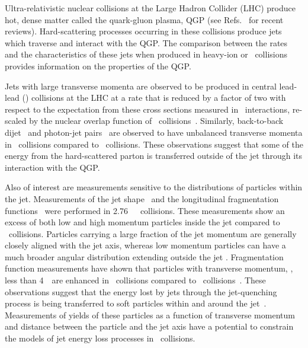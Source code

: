 
Ultra-relativistic nuclear collisions at the Large Hadron Collider (LHC) produce hot, dense matter
called the quark-gluon plasma, QGP (see Refs.~\cite{Roland:2014jsa,Busza:2018rrf} for recent reviews).
Hard-scattering processes occurring in these collisions produce jets which
traverse and interact with the QGP. The comparison between the rates and the characteristics of these jets when produced in heavy-ion or \pp\ collisions provides information on the properties of the QGP.

Jets with large transverse momenta are observed to be produced in central lead-lead (\pbpb) collisions at the LHC at a rate that is reduced by a factor of two with respect to the expectation from these cross sections measured in \pp\ interactions, re-scaled by the nuclear overlap function of \pbpb\ collisions~\cite{Abelev:2013kqa,Aad:2014bxa,Khachatryan:2016jfl}. 
Similarly, back-to-back dijet~\cite{Aad:2010bu,Chatrchyan:2011sx,Aaboud:2017eww} 
and photon-jet pairs~\cite{Chatrchyan:2012gt} are observed to have
unbalanced transverse momenta in \pbpb\ collisions compared to \pp\ collisions.
These observations suggest that some of the energy from the hard-scattered parton is
transferred outside of the jet through its interaction with the QGP.  

Also of interest are measurements sensitive to the distributions of particles
within the jet.  Measurements of the jet shape~\cite{Chatrchyan:2013kwa} and  the longitudinal fragmentation functions~\cite{Aad:2014wha,Chatrchyan:2014ava,Aaboud:2017bzv} were performed in 2.76~\TeV\ \pbpb\
collisions.
These measurements show an excess of both low and high momentum particles inside the jet compared to \pp\ collisions.
Particles carrying a large fraction of the jet momentum are generally closely
aligned with the jet axis, whereas low momentum particles can have a much broader
angular distribution extending outside the jet \cite{Khachatryan:2016tfj,Sirunyan:2018jqr}. 
Fragmentation function measurements have shown that particles with transverse momentum, \pT,
less than 4~\GeV\
are enhanced in \pbpb\ collisions compared to \pp\ collisions~\cite{Aaboud:2017bzv}.
These observations suggest that the energy lost by jets through the jet-quenching process is being transferred to soft particles within and around the jet~\cite{Qin:2015srf,Blaizot:2014ula}. Measurements of yields of these particles as a function of transverse momentum and
distance between the particle and the jet axis have a potential to constrain
the models of jet energy loss processes in \pbpb\ collisions.

